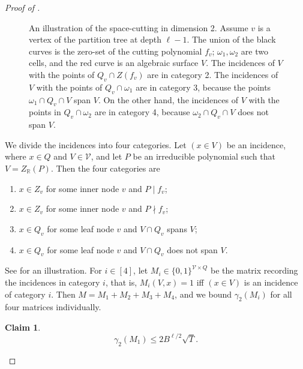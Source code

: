 \documentclass[10pt,a4paper]{amsart}
\newtheorem{claim}{Claim}
\begin{document}
\begin{proof}[Proof of ]
\begin{figure}
\begin{center}
\end{center}
\caption{An illustration of the space-cutting in dimension 2. Assume $v$ is a vertex of the partition tree at depth $\ell-1$. The union of the black curves is the zero-set of the cutting polynomial $f_v$; $\omega_1,\omega_2$ are two cells, and the red curve is an algebraic surface $V$. The incidences of $V$ with the points of $Q_v\cap Z(f_v)$ are in category 2.  The incidences of $V$ with the points of $Q_v\cap \omega_1$ are in category 3, because the points $\omega_1\cap Q_v \cap V$ span $V$. On the other hand, the incidences of $V$ with the points in $Q_v\cap \omega_2$ are in category 4, because $\omega_2\cap Q_v\cap V $ does not span $V$.}
\label{fig:1}
\end{figure}

		
		We divide the incidences into four categories. Let $(x\in V)$ be an incidence, where $x\in Q$ and $V\in \mathcal{V}$, and let $P$ be an irreducible polynomial such that $V=Z_{\mathbb{R}}(P)$. Then the four categories are
		\begin{enumerate}
			\item $x\in Z_v$ for some inner node $v$ and $P\mid f_v$;
			\item $x\in Z_v$ for some inner node $v$ and $P\nmid f_v$;
			\item $x\in Q_v$ for some leaf node $v$ and $V\cap Q_v$ spans $V$;
			\item $x\in Q_v$ for some leaf node $v$ and $V\cap Q_v$ does not span $V$.
		\end{enumerate}
		See  for an illustration. For $i\in [4]$, let $M_i\in \{0,1\}^{\mathcal{V}\times Q}$ be the matrix recording the incidences in category $i$, that is, $M_i(V,x)=1$ iff $(x\in V)$ is an incidence of category $i$. Then $M=M_1+M_2+M_3+M_4$, and we bound $\gamma_2(M_i)$ for all four matrices individually.
		
		\begin{claim}
			$$\gamma_2(M_1)\leq2 B^{\ell/2}\sqrt{T}.$$
		\end{claim}
		

\end{proof}
\end{document}
